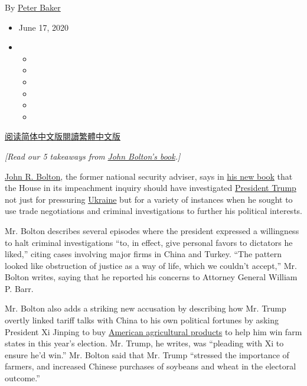 By \href{https://www.nytimes3xbfgragh.onion/by/peter-baker}{Peter Baker}

\begin{itemize}
\item
  June 17, 2020
\item
  \begin{itemize}
  \item
  \item
  \item
  \item
  \item
  \item
  \end{itemize}
\end{itemize}

\href{https://cn.nytimes3xbfgragh.onion/usa/20200618/bolton-book-trump-impeached/}{阅读简体中文版}\href{https://cn.nytimes3xbfgragh.onion/usa/20200618/bolton-book-trump-impeached/zh-han}{閱讀繁體中文版}

\emph{{[}Read our 5 takeaways from}
\href{https://www.nytimes3xbfgragh.onion/2020/06/18/us/politics/john-bolton-memoir-takeaways.html}{\emph{John
Bolton's book}}\emph{.{]}}

\href{https://www.nytimes3xbfgragh.onion/2020/06/10/us/politics/trump-john-bolton-book.html}{John
R. Bolton}, the former national security adviser, says in
\href{https://www.nytimes3xbfgragh.onion/2020/06/20/us/politics/john-bolton-book-ruling.html}{his
new book} that the House in its impeachment inquiry should have
investigated
\href{https://www.nytimes3xbfgragh.onion/2020/01/27/us/politics/john-bolton-trump.html}{President
Trump} not just for pressuring
\href{https://www.nytimes3xbfgragh.onion/2020/01/27/us/politics/john-bolton-trump.html}{Ukraine}
but for a variety of instances when he sought to use trade negotiations
and criminal investigations to further his political interests.

Mr. Bolton describes several episodes where the president expressed a
willingness to halt criminal investigations ``to, in effect, give
personal favors to dictators he liked,'' citing cases involving major
firms in China and Turkey. ``The pattern looked like obstruction of
justice as a way of life, which we couldn't accept,'' Mr. Bolton writes,
saying that he reported his concerns to Attorney General William P.
Barr.

Mr. Bolton also adds a striking new accusation by describing how Mr.
Trump overtly linked tariff talks with China to his own political
fortunes by asking President Xi Jinping to buy
\href{https://www.nytimes3xbfgragh.onion/2019/10/11/business/economy/us-china-trade-deal.html}{American
agricultural products} to help him win farm states in this year's
election. Mr. Trump, he writes, was ``pleading with Xi to ensure he'd
win.'' Mr. Bolton said that Mr. Trump ``stressed the importance of
farmers, and increased Chinese purchases of soybeans and wheat in the
electoral outcome.''

